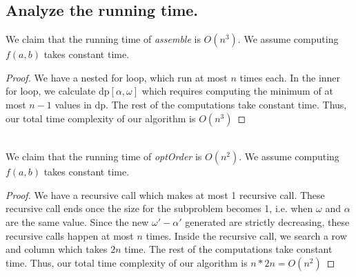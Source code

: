 \documentclass[11pt]{scrartcl}
\begin{document}
	\iffalse
		\begin{corollary*}
			The algorithm, optOrder, correctly traces the events selected.
			\begin{proof}
				$$\textbf{DO THIS PART }$$
			\end{proof}
		\end{corollary*}
	\fi

	\subsection{
		Analyze the running time.
	}
	We claim that the running time of \textit{assemble} is $O(n^3)$.
	We assume computing $f(a,b)$ takes constant time.

	\begin{proof}
		We have a nested for loop, which run at most $n$ times each.
		In the inner for loop, we calculate dp$[\alpha,\omega]$ which requires computing the minimum of at most $n-1$ values
		in dp. The rest of the computations take constant time.
		Thus, our total time complexity of our algorithm is $O(n^3)$
	\end{proof}\-\\
	We claim that the running time of \textit{optOrder} is $O(n^2)$. We assume computing $f(a,b)$ takes constant time.
	\begin{proof}
		We have a recursive call which makes at most 1 recursive call. These recursive call
		ends once the size for the subproblem becomes 1, i.e. when $\omega$ and $\alpha$ are the same
		value. Since the new $\omega' - \alpha'$ generated are strictly decreasing, these recursive calls happen at most $n$ times.
		Inside the recursive call, we search a row and column which takes $2n$ time. The rest of the computations take constant time.
		Thus, our total time complexity of our algorithm is $n*2n = O(n^2)$
	\end{proof}
\fi
\end{document}
